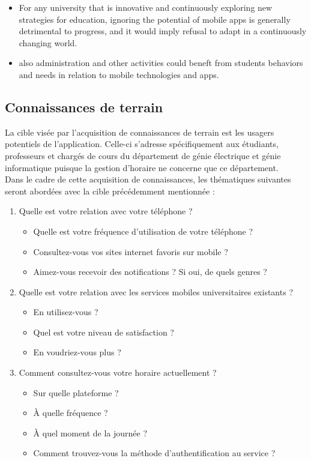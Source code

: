 		\begin{itemize}
			\item For any university that is innovative and continuously exploring new strategies for education, ignoring the potential of mobile apps is generally detrimental to progress, and it would imply refusal to adapt in a continuously changing world. 
			\item also administration and other activities could beneft from students behaviors and needs in relation to mobile technologies and apps.
		\end{itemize}
	
	\subsection{Connaissances de terrain}
	La cible visée par l'acquisition de connaissances de terrain est les usagers potentiels de l'application. Celle-ci s'adresse spécifiquement aux étudiants, professeurs et chargés de cours du département de génie électrique et génie informatique puisque la gestion d'horaire ne concerne que ce département. \\
	
	Dans le cadre de cette acquisition de connaissances, les thématiques suivantes seront abordées avec la cible précédemment mentionnée :

	\begin{enumerate}
		\item Quelle est votre relation avec votre téléphone ?
		\begin{itemize}
			\item Quelle est votre fréquence d'utilisation de votre téléphone ?
			\item Consultez-vous vos sites internet favoris sur mobile ?
			\item Aimez-vous recevoir des notifications ? Si oui, de quels genres ?
		\end{itemize}
		\item Quelle est votre relation avec les services mobiles universitaires existants ?
		\begin{itemize}
			\item En utilisez-vous ?
			\item Quel est votre niveau de satisfaction ?
			\item En voudriez-vous plus ?
		\end{itemize}
		\item Comment consultez-vous votre horaire actuellement ?
		\begin{itemize}
			\item Sur quelle plateforme ?
			\item À quelle fréquence ?
			\item À quel moment de la journée ?
			\item Comment trouvez-vous la méthode d'authentification au service ?
		\end{itemize}
	\end{enumerate}
	
